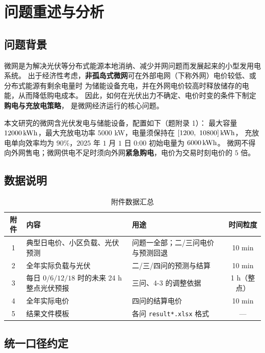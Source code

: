 \section{问题重述与分析}

\subsection{问题背景}

微网是为解决光伏等分布式能源本地消纳、减少并网问题而发展起来的小型发用电系统。
出于经济性考虑，\textbf{非孤岛式微网}可在外部电网（下称外网）电价较低、或分布式能源有剩余电量时
为储能设备充电，并在外网电价较高时释放储存的电能，从而降低购电成本。
因此，如何在光伏出力不确定、电价时变的条件下制定\textbf{购电与充放电策略}，
是微网经济运行的核心问题。

本文研究的微网含光伏发电与储能设备，配置如下（题附录 1）：
最大容量 $12000\,\text{kWh}$，最大充放电功率 $5000$ kW，电量须保持在 $[1200,\ 10800]\,\text{kWh}$，
充放电单向效率均为 $90\%$，$2025$ 年 $1$ 月 $1$ 日 $0$:00 初始电量为 $6000\,\text{kWh}$。
微网不得向外网售电；微网供电不足时须向外网\textbf{紧急购电}，电价为交易时刻电价的 $5$ 倍。

\subsection{数据说明}

\begin{table}[H]
\centering
\caption{附件数据汇总}
\label{tab:data}
\small
\setlength{\tabcolsep}{5pt}
\begin{tabularx}{\textwidth}{@{}c l X c@{}}
\toprule
附件 & 内容 & 用途 & 时间粒度 \\
\midrule
1 & 典型日电价、小区负载、光伏预测 & 问题一全部；二/三问电价与预测回退 & 10 min \\
2 & 全年实际负载与光伏 & 二/三/四问的预测与结算 & 10 min \\
3 & 每日 $0/6/12/18$ 时的未来 24 h 整点光伏预报 & 三问、4-3 的调整依据 & 1 h（整点）\\
4 & 全年实际电价 & 四问的结算电价 & 10 min \\
5 & 结果文件模板 & 各问 \texttt{result*.xlsx} 格式 & — \\
\bottomrule
\end{tabularx}
\end{table}

\subsection{统一口径约定}
\label{sec:conventions}

